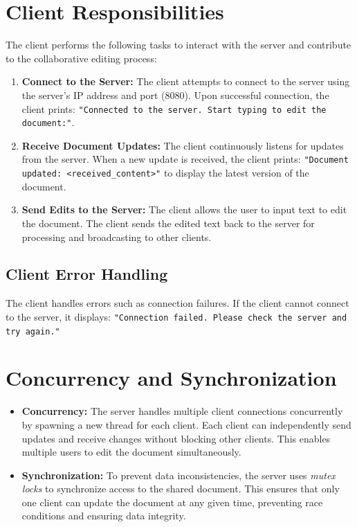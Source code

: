 \documentclass{exam}
\begin{document}
\section{Client Responsibilities}
The client performs the following tasks to interact with the server and contribute to the collaborative editing process:

\begin{enumerate}
    \item \textbf{Connect to the Server:} The client attempts to connect to the server using the server's IP address and port (8080). Upon successful connection, the client prints: \texttt{"Connected to the server. Start typing to edit the document:"}.
    \item \textbf{Receive Document Updates:} The client continuously listens for updates from the server. When a new update is received, the client prints: \texttt{"Document updated: <received\_content>"} to display the latest version of the document.
    \item \textbf{Send Edits to the Server:} The client allows the user to input text to edit the document. The client sends the edited text back to the server for processing and broadcasting to other clients.
\end{enumerate}

\subsection*{Client Error Handling}
The client handles errors such as connection failures. If the client cannot connect to the server, it displays: \texttt{"Connection failed. Please check the server and try again."}

\section*{Concurrency and Synchronization}
\begin{itemize}
        \item \textbf{Concurrency:} The server handles multiple client connections concurrently by spawning a new thread for each client. Each client can independently send updates and receive changes without blocking other clients. This enables multiple users to edit the document simultaneously.
    \item \textbf{Synchronization:} To prevent data inconsistencies, the server uses \textit{mutex locks} to synchronize access to the shared document. This ensures that only one client can update the document at any given time, preventing race conditions and ensuring data integrity.
\end{itemize}
\end{document}
